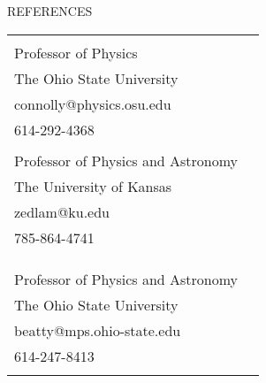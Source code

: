\documentclass{resume} %
\begin{document}
\newpage
\begin{rSection}{REFERENCES}

\begin{tabular}{lr}
\begin{minipage}[t]{2.5in}
{\bf Amy Connolly}\\
Professor of Physics\\
The Ohio State University\\
connolly@physics.osu.edu\\
614-292-4368\\
\end{minipage}
&
\begin{minipage}[t]{2.5in}
{\bf Dave Besson}\\
Professor of Physics and Astronomy\\
The University of Kansas\\
zedlam@ku.edu\\
785-864-4741\\
\end{minipage}
\\
\\ %
\begin{minipage}[t]{2.5in}
{\bf James Beatty}\\
Professor of Physics and Astronomy\\
The Ohio State University\\
beatty@mps.ohio-state.edu\\
614-247-8413\\
\end{minipage}
\end{tabular}

\end{rSection}
\end{document}

